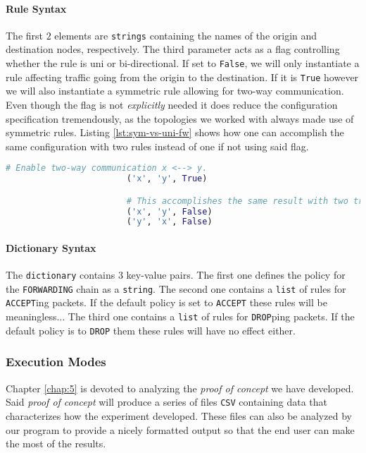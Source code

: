                 \paragraph{Rule Syntax}
                    The first $2$ elements are \texttt{strings} containing the names of the origin and destination nodes, respectively. The third parameter acts as a flag controlling whether the rule is uni or bi-directional. If set to \texttt{False}, we will only instantiate a rule affecting traffic going from the origin to the destination. If it is \texttt{True} however we will also instantiate a symmetric rule allowing for two-way communication. Even though the flag is not \textit{explicitly} needed it does reduce the configuration specification tremendously, as the topologies we worked with always made use of symmetric rules. Listing \ref{lst:sym-vs-uni-fw} shows how one can accomplish the same configuration with two rules instead of one if not using said flag.\\

                    \begin{lstlisting}[language = python, caption = Uni-directional vs. symmetric firewall rules., label = lst:sym-vs-uni-fw]
                        # Enable two-way communication x <--> y.
                        ('x', 'y', True)

                        # This accomplishes the same result with two triplets.
                        ('x', 'y', False)
                        ('y', 'x', False)
                    \end{lstlisting}

                \paragraph{Dictionary Syntax}
                    The \texttt{dictionary} contains $3$ key-value pairs. The first one defines the policy for the \texttt{FORWARDING} chain as a \texttt{string}. The second one contains a \texttt{list} of rules for \texttt{ACCEPT}ing packets. If the default policy is set to \texttt{ACCEPT} these rules will be meaningless... The third one contains a \texttt{list} of rules for \texttt{DROP}ping packets. If the default policy is to \texttt{DROP} them these rules will have no effect either.\\

            \subsubsection{Execution Modes}
                Chapter \ref{chap:5} is devoted to analyzing the \textit{proof of concept} we have developed. Said \textit{proof of concept} will produce a series of files \texttt{CSV} containing data that characterizes how the experiment developed. These files can also be analyzed by our program to provide a nicely formatted output so that the end user can make the most of the results.\\

